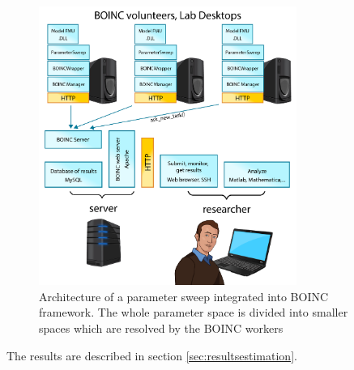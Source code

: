 \begin{figure}[htb]
    \centering
     \includegraphics[width=0.75\textwidth]{img/chapter3-architekturaparamsweep-01.png}    
    \caption{Architecture of a parameter sweep integrated into BOINC framework. The whole parameter space is divided into smaller spaces which are resolved by the BOINC workers}
    \label{fig:paramsweeparch}
\end{figure}

The results are described in section \ref{sec:resultsestimation}.

